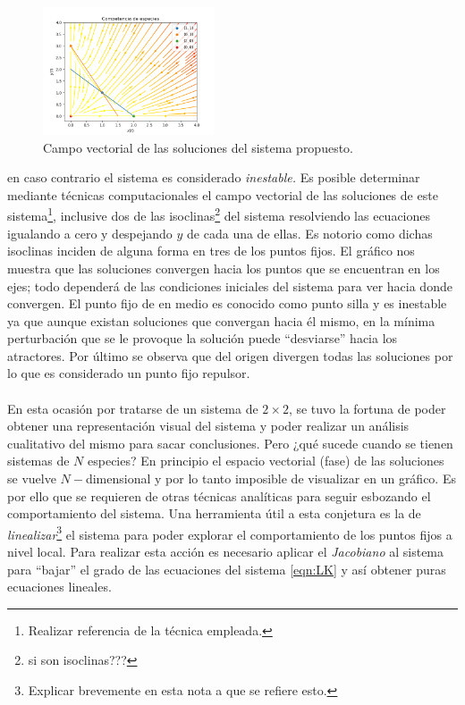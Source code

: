 \documentclass[11pt,a4paper]{article}
\begin{document}
\begin{figure} \vspace{-30pt} \begin{center}
		\includegraphics[width=0.45\textwidth]{../Imagenes/Competencia de especies} 
		\end{center} 
		\vspace{-20pt} 
		\caption{Campo vectorial de las soluciones del sistema propuesto.} 
		\vspace{-10pt}
		\label{fig:CompetenciaEspecies}
\end{figure} 
en caso contrario el sistema es considerado \textit{inestable.} Es posible determinar mediante técnicas computacionales el campo vectorial de las soluciones de este sistema\footnote{Realizar referencia de la técnica empleada.}, inclusive dos de las isoclinas\footnote{si son isoclinas???} del sistema resolviendo las ecuaciones igualando a cero y despejando $y$ de cada una de ellas. Es notorio como dichas isoclinas inciden de alguna forma en tres de los puntos fijos. El gráfico nos muestra que las soluciones convergen hacia los puntos que se encuentran en los ejes; todo dependerá de las condiciones iniciales del sistema para ver hacia donde convergen. El punto fijo de en medio es conocido como punto silla y es inestable ya que aunque existan soluciones que convergan hacia él mismo, en la mínima perturbación que se le provoque la solución puede ``desviarse'' hacia los atractores. Por último se observa que del origen divergen todas las soluciones por lo que es considerado un punto fijo repulsor.\\
\\
En esta ocasión por tratarse de un sistema de $2\times 2$, se tuvo la fortuna de poder obtener una representación visual del sistema y poder realizar un análisis cualitativo del mismo para sacar conclusiones. Pero ¿qué sucede cuando se tienen sistemas de $N$ especies? En principio el espacio vectorial (fase) de las soluciones se vuelve $N-$dimensional y por lo tanto imposible de visualizar en un gráfico. Es por ello que se requieren de otras técnicas analíticas para seguir esbozando el comportamiento del sistema. Una herramienta útil a esta conjetura es la de \textit{linealizar}\footnote{Explicar brevemente en esta nota a que se refiere esto.} el sistema para poder explorar el comportamiento de los puntos fijos a nivel local. Para realizar esta acción es necesario aplicar el \textit{Jacobiano} al sistema para ``bajar'' el grado de las ecuaciones del sistema \ref{eqn:LK} y así obtener puras ecuaciones lineales.\\
\end{document}
